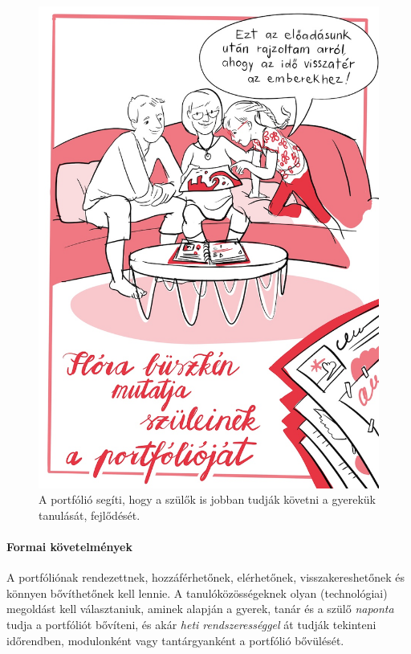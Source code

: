 \begin{figure}
\centering
\includegraphics{pics/4b_portfolio_flora.jpg}
\caption{A portfólió segíti, hogy a szülők is jobban tudják követni a gyerekük tanulását, fejlődését. }
\end{figure}

\hypertarget{formai-kovetelmenyek}{%
\paragraph{Formai követelmények}\label{formai-kovetelmenyek}}

A portfóliónak rendezettnek, hozzáférhetőnek, elérhetőnek,
visszakereshetőnek és könnyen bővíthetőnek kell lennie.
A tanulóközösségeknek 
olyan
(technológiai) megoldást kell választaniuk,\break
aminek
alapján a gyerek, tanár és a szülő \emph{naponta} tudja a portfóliót
bővíteni, és akár \emph{heti rendszerességgel} át tudják tekinteni
időrendben, modulonként vagy tantárgyanként a portfólió bővülését.
